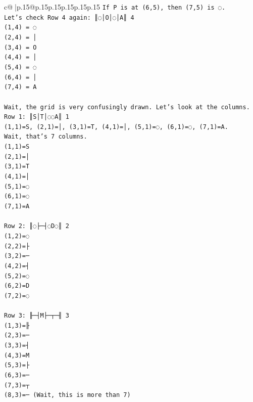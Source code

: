 \documentclass{article}
\begin{document}
{\begin{supertabular}{c@{$\;$}|p{.15\linewidth}@{}p{.15\linewidth}p{.15\linewidth}p{.15\linewidth}p{.15\linewidth}p{.15\linewidth}}
{{{\texttt{If P is at (6,5), then (7,5) is ◌.} \\
\texttt{Let's check Row 4 again: ║◌│O│◌│A║ 4} \\
\texttt{(1,4) = ◌} \\
\texttt{(2,4) = │} \\
\texttt{(3,4) = O} \\
\texttt{(4,4) = │} \\
\texttt{(5,4) = ◌} \\
\texttt{(6,4) = │} \\
\texttt{(7,4) = A} \\
\\ 
\texttt{Wait, the grid is very confusingly drawn. Let's look at the columns.} \\
\texttt{Row 1: ║S│T│◌◌A║ 1} \\
\texttt{(1,1)=S, (2,1)=│, (3,1)=T, (4,1)=│, (5,1)=◌, (6,1)=◌, (7,1)=A.} \\
\texttt{Wait, that's 7 columns.} \\
\texttt{(1,1)=S} \\
\texttt{(2,1)=│} \\
\texttt{(3,1)=T} \\
\texttt{(4,1)=│} \\
\texttt{(5,1)=◌} \\
\texttt{(6,1)=◌} \\
\texttt{(7,1)=A} \\
\\ 
\texttt{Row 2: ║◌├─┤◌D◌║ 2} \\
\texttt{(1,2)=◌} \\
\texttt{(2,2)=├} \\
\texttt{(3,2)=─} \\
\texttt{(4,2)=┤} \\
\texttt{(5,2)=◌} \\
\texttt{(6,2)=D} \\
\texttt{(7,2)=◌} \\
\\ 
\texttt{Row 3: ╟─┤M├─┬─╢ 3} \\
\texttt{(1,3)=╟} \\
\texttt{(2,3)=─} \\
\texttt{(3,3)=┤} \\
\texttt{(4,3)=M} \\
\texttt{(5,3)=├} \\
\texttt{(6,3)=─} \\
\texttt{(7,3)=┬} \\
\texttt{(8,3)=─ (Wait, this is more than 7)} \\
}}}
\end{supertabular}}
\end{document}
